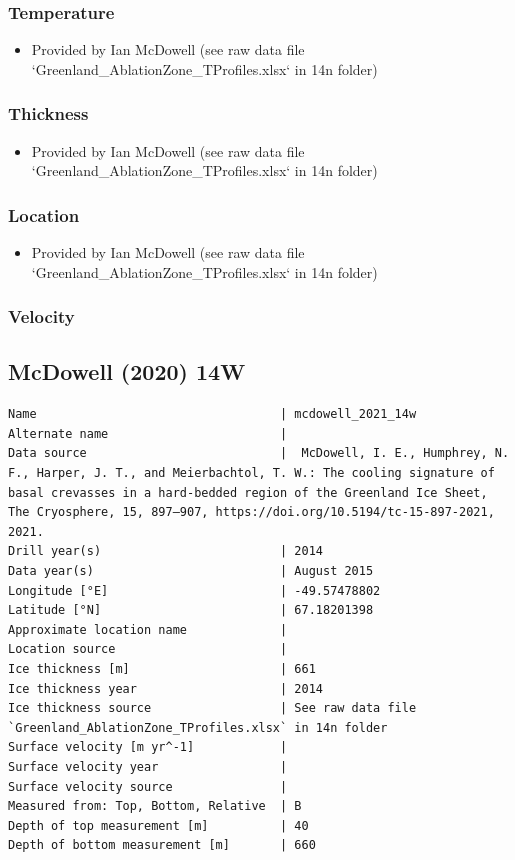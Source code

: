 \documentclass[article,a4paper,times,11pt,twoside]{article}
\begin{document}
\subsubsection{Temperature}
\label{sec:org2463e39}

\begin{itemize}
\item Provided by Ian McDowell (see raw data file `Greenland\_AblationZone\_TProfiles.xlsx` in 14n folder)
\end{itemize}

\subsubsection{Thickness}
\label{sec:org7326f13}

\begin{itemize}
\item Provided by Ian McDowell (see raw data file `Greenland\_AblationZone\_TProfiles.xlsx` in 14n folder)
\end{itemize}

\subsubsection{Location}
\label{sec:org1420909}

\begin{itemize}
\item Provided by Ian McDowell (see raw data file `Greenland\_AblationZone\_TProfiles.xlsx` in 14n folder)
\end{itemize}

\subsubsection{Velocity}
\label{sec:orgac9db64}
\clearpage
\subsection{McDowell (2020) 14W}
\label{sec:orgfe651fa}
\begin{verbatim}
Name                                  | mcdowell_2021_14w
Alternate name                        | 
Data source                           |  McDowell, I. E., Humphrey, N. F., Harper, J. T., and Meierbachtol, T. W.: The cooling signature of basal crevasses in a hard-bedded region of the Greenland Ice Sheet, The Cryosphere, 15, 897–907, https://doi.org/10.5194/tc-15-897-2021, 2021.
Drill year(s)                         | 2014
Data year(s)                          | August 2015
Longitude [°E]                        | -49.57478802
Latitude [°N]                         | 67.18201398
Approximate location name             | 
Location source                       | 
Ice thickness [m]                     | 661
Ice thickness year                    | 2014
Ice thickness source                  | See raw data file `Greenland_AblationZone_TProfiles.xlsx` in 14n folder
Surface velocity [m yr^-1]            | 
Surface velocity year                 | 
Surface velocity source               | 
Measured from: Top, Bottom, Relative  | B
Depth of top measurement [m]          | 40
Depth of bottom measurement [m]       | 660
\end{verbatim}
\end{document}
